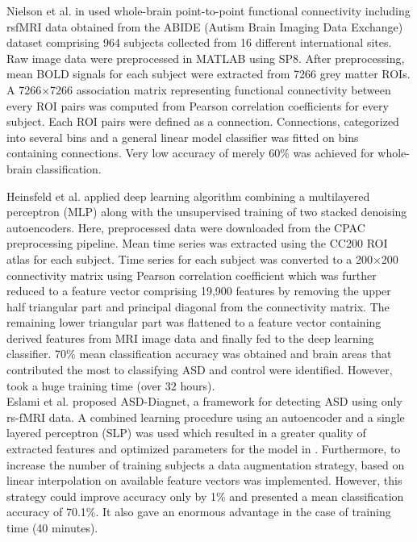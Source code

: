 Nielson et al. in \cite{nielsen2013multisite} used whole-brain point-to-point functional connectivity including rsfMRI
data obtained from the ABIDE (Autism Brain Imaging Data Exchange) dataset
comprising 964 subjects collected from 16 different international sites. Raw image data were
preprocessed in MATLAB using SP8. After preprocessing, mean BOLD signals for each
subject were extracted from 7266 grey matter ROIs. A 7266×7266 association matrix
representing functional connectivity between every ROI pairs was computed from Pearson
correlation coefficients for every subject. Each ROI pairs were defined as a connection.
Connections, categorized into several bins and a general linear model classifier was fitted on
bins containing connections. Very low accuracy of merely 60\% was achieved for whole-brain
classification.

Heinsfeld et al. \cite{heinsfeld2018identification} applied deep learning algorithm combining a multilayered perceptron
(MLP) along with the unsupervised training of two stacked denoising autoencoders. Here,
preprocessed data were downloaded from the CPAC preprocessing pipeline. Mean time series
was extracted using the CC200 ROI atlas for each subject. Time series for each subject was
converted to a 200×200 connectivity matrix using Pearson correlation coefficient which was
further reduced to a feature vector comprising 19,900 features by removing the upper half
triangular part and principal diagonal from the connectivity matrix. The remaining lower
triangular part was flattened to a feature vector containing derived features from MRI image
data and finally fed to the deep learning classifier. 70\% mean classification accuracy was obtained and brain areas that contributed the most to classifying ASD and control were
identified. However, took a huge training time (over 32 hours).\\

Eslami et al. \cite{eslami2019asd} proposed ASD-Diagnet, a framework for detecting ASD using only rs-fMRI
data. A combined learning procedure using an autoencoder and a single layered perceptron
(SLP) was used which resulted in a greater quality of extracted features and optimized
parameters for the model in \cite{eslami2019asd}. Furthermore, to increase the number of training subjects a
data augmentation strategy, based on linear interpolation on available feature vectors was
implemented. However, this strategy could improve accuracy only by 1\% and presented a
mean classification accuracy of 70.1\%. It also gave an enormous advantage in the case of
training time (40 minutes).\\

